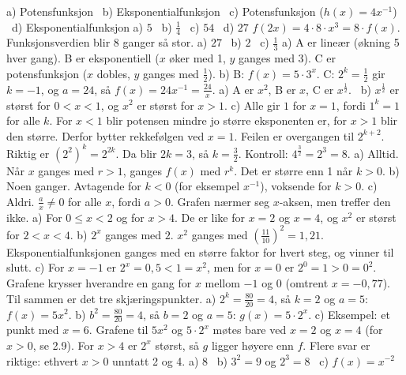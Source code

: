  a) Potensfunksjon \ b) Eksponentialfunksjon \ c) Potensfunksjon ($h(x) = 4x^{-1}$) \ d) Eksponentialfunksjon
 a) $5$ \ b) $\frac14$ \ c) $54$ \ d) $27$
 $f(2x) = 4 \cdot 8 \cdot x^3 = 8 \cdot f(x)$. Funksjonsverdien blir 8 ganger så stor.
 a) $27$ \ b) $2$ \ c) $\frac13$
 a) A er lineær (økning 5 hver gang). B er eksponentiell ($x$ øker med 1, $y$ ganges med 3). C er potensfunksjon ($x$ dobles, $y$ ganges med $\frac12$).
b) B: $f(x) = 5 \cdot 3^x$. C: $2^k = \frac12$ gir $k = -1$, og $a = 24$, så $f(x) = 24x^{-1} = \frac{24}{x}$.
 a) A er $x^2$, B er $x$, C er $x^{\tfrac12}$. \ b) $x^{\tfrac12}$ er størst for $0 < x < 1$, og $x^2$ er størst for $x > 1$.
c) Alle gir $1$ for $x = 1$, fordi $1^k = 1$ for alle $k$. For $x < 1$ blir potensen mindre jo større eksponenten er, for $x > 1$ blir den større. Derfor bytter rekkefølgen ved $x = 1$.
 Feilen er overgangen til $2^{k+2}$. Riktig er $(2^2)^k = 2^{2k}$. Da blir $2k = 3$, så $k = \frac32$. Kontroll: $4^{\tfrac32} = 2^3 = 8$.
 a) Alltid. Når $x$ ganges med $r > 1$, ganges $f(x)$ med $r^k$. Det er større enn 1 når $k > 0$.
b) Noen ganger. Avtagende for $k < 0$ (for eksempel $x^{-1}$), voksende for $k > 0$.
c) Aldri. $\frac{a}{x} \ne 0$ for alle $x$, fordi $a > 0$. Grafen nærmer seg $x$-aksen, men treffer den ikke.
 a) For $0 \le x < 2$ og for $x > 4$. De er like for $x = 2$ og $x = 4$, og $x^2$ er størst for $2 < x < 4$.
b) $2^x$ ganges med $2$. $x^2$ ganges med $\left(\frac{11}{10}\right)^2 = 1{,}21$. Eksponentialfunksjonen ganges med en større faktor for hvert steg, og vinner til slutt.
c) For $x = -1$ er $2^x = 0{,}5 < 1 = x^2$, men for $x = 0$ er $2^0 = 1 > 0 = 0^2$. Grafene krysser hverandre en gang for $x$ mellom $-1$ og $0$ (omtrent $x = -0{,}77$). Til sammen er det tre skjæringspunkter.
 a) $2^k = \frac{80}{20} = 4$, så $k = 2$ og $a = 5$: $f(x) = 5x^2$.
b) $b^2 = \frac{80}{20} = 4$, så $b = 2$ og $a = 5$: $g(x) = 5 \cdot 2^x$.
c) Eksempel: et punkt med $x = 6$. Grafene til $5x^2$ og $5 \cdot 2^x$ møtes bare ved $x = 2$ og $x = 4$ (for $x > 0$, se 2.9). For $x > 4$ er $2^x$ størst, så $g$ ligger høyere enn $f$. Flere svar er riktige: ethvert $x > 0$ unntatt 2 og 4.
 a) $8$ \ b) $3^2 = 9$ og $2^3 = 8$ \ c) $f(x) = x^{-2}$

